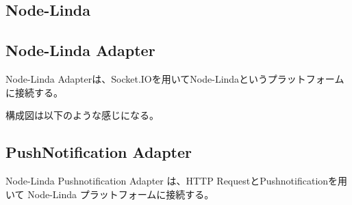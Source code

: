 
\subsection{Node-Linda}

\subsection{Node-Linda Adapter}

Node-Linda Adapterは、Socket.IOを用いてNode-Lindaというプラットフォームに接続する。

構成図は以下のような感じになる。

\subsection{PushNotification Adapter}

Node-Linda Pushnotification Adapter は、HTTP RequestとPushnotificationを用いて
Node-Linda プラットフォームに接続する。
